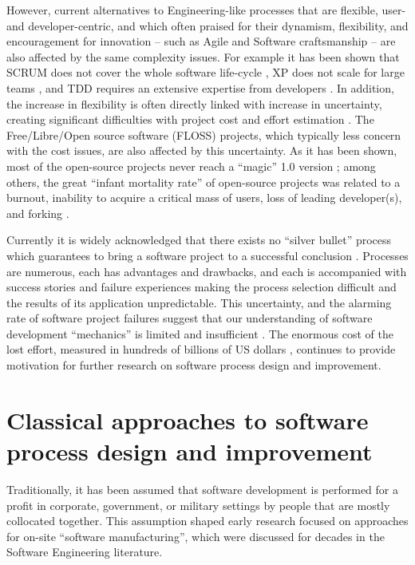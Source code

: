 However, current alternatives to Engineering-like processes that are flexible, user- and developer-centric,
and which often praised for their dynamism, flexibility, and encouragement for innovation --
such as Agile and Software craftsmanship -- are also affected by the same complexity issues. 
For example it has been shown that SCRUM does not cover the whole software life-cycle \cite{Cohn_SCRUM}, 
XP does not scale for large teams \cite{Beck_XP}, 
and TDD requires an extensive expertise from developers \cite{Beck_TDD}.
In addition, the increase in flexibility is often directly linked with increase in uncertainty, creating 
significant difficulties with project cost and effort estimation \cite{citeulike:12933080} \cite{citeulike:9928907}.
The Free/Libre/Open source software (FLOSS) projects, which typically less concern with the cost issues, 
are also affected by this uncertainty. 
As it has been shown, most of the open-source projects never reach a ``magic'' 1.0 version 
\cite{citeulike:12480029}; among others, the great ``infant mortality rate'' of open-source 
projects was related to a burnout, inability to acquire a critical mass of users, 
loss of leading developer(s), and forking \cite{richter2007critique}. 

Currently it is widely acknowledged that there exists no ``silver bullet'' process which 
guarantees to bring a software project to a successful conclusion \cite{citeulike:1986013}. 
Processes are numerous, each has advantages and drawbacks, and each is accompanied with 
success stories and failure experiences making the process selection difficult and the results of 
its application unpredictable.
This uncertainty, and the alarming rate of software project failures suggest that our understanding 
of software development ``mechanics'' is limited and insufficient \cite{citeulike:12550665}. 
The enormous cost of the lost effort, measured in hundreds of billions of US dollars 
\cite{citeulike:2207657} \cite{citeulike:2207653} \cite{citeulike:2207655}, 
continues to provide motivation for further research on software process design and improvement. 

%
%
\section{Classical approaches to software process design and improvement}\label{section_software_process_design}
Traditionally, it has been assumed that software development is performed for a profit in 
corporate, government, or military settings by people that are mostly collocated together. 
This assumption shaped early research focused on approaches for on-site ``software manufacturing'',
which were discussed for decades in the Software Engineering literature. 


